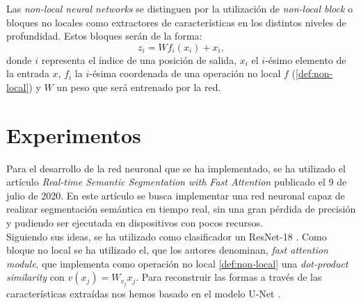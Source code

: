 Las \emph{non-local neural networks} se distinguen por la utilización de \emph{non-local block} o bloques no locales como extractores de características en los distintos niveles de profundidad. Estos bloques serán de la forma: $$z_i=W f_i(x_i) + x_i,$$  donde $i$ representa el índice de una posición de salida, $x_i$ el $i$-ésimo elemento de la entrada $x$, $f_i$ la $i$-ésima coordenada de una operación no local $f$ (\autoref{def:non-local}) y $W$ un peso que será entrenado por la red. \\





\section{Experimentos}

Para el desarrollo de la red neuronal que se ha implementado, se ha utilizado el artículo \emph{Real-time Semantic Segmentation with Fast Attention} \cite{2020arXiv200703815H} publicado el 9 de julio de 2020. En este artículo se busca implementar una red neuronal capaz de realizar segmentación semántica en tiempo real, sin una gran pérdida de precisión y pudiendo ser ejecutada en dispositivos con pocos recursos.\\

Siguiendo sus ideas, se ha utilizado como clasificador un ResNet-18 \cite{DBLP:journals/corr/HeZRS15}. Como bloque no local se ha utilizado el, que los autores denominan, \emph{fast attention module}, que implementa como operación no local \autoref{def:non-local} una \emph{dot-product similarity} con $v(x_j)=W_{v_j}x_j$. Para reconstruir las formas a través de las características extraídas nos hemos basado en el modelo U-Net \cite{2015arXiv150504597R}.
